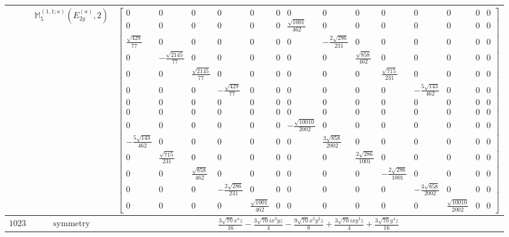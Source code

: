 \documentclass[fleqn,8pt,landscape]{jsarticle}
\begin{document}
\begin{longtable}{ccc}
$  $ & $ \mathbb{M}_{5}^{(1,1;a)}(E_{2g}^{(a)},2) $ & $ \begin{bmatrix} 0 & 0 & 0 & 0 & 0 & 0 & 0 & 0 & 0 & 0 & 0 & 0 & 0 & 0 \\ 0 & 0 & 0 & 0 & 0 & 0 & \frac{\sqrt{1001}}{462} & 0 & 0 & 0 & 0 & 0 & 0 & 0 \\ \frac{\sqrt{429}}{77} & 0 & 0 & 0 & 0 & 0 & 0 & - \frac{2 \sqrt{286}}{231} & 0 & 0 & 0 & 0 & 0 & 0 \\ 0 & - \frac{\sqrt{2145}}{77} & 0 & 0 & 0 & 0 & 0 & 0 & \frac{\sqrt{858}}{462} & 0 & 0 & 0 & 0 & 0 \\ 0 & 0 & \frac{\sqrt{2145}}{77} & 0 & 0 & 0 & 0 & 0 & 0 & \frac{\sqrt{715}}{231} & 0 & 0 & 0 & 0 \\ 0 & 0 & 0 & - \frac{\sqrt{429}}{77} & 0 & 0 & 0 & 0 & 0 & 0 & - \frac{5 \sqrt{143}}{462} & 0 & 0 & 0 \\ 0 & 0 & 0 & 0 & 0 & 0 & 0 & 0 & 0 & 0 & 0 & 0 & 0 & 0 \\ 0 & 0 & 0 & 0 & 0 & 0 & 0 & 0 & 0 & 0 & 0 & 0 & 0 & 0 \\ 0 & 0 & 0 & 0 & 0 & 0 & - \frac{\sqrt{10010}}{2002} & 0 & 0 & 0 & 0 & 0 & 0 & 0 \\ - \frac{5 \sqrt{143}}{462} & 0 & 0 & 0 & 0 & 0 & 0 & \frac{3 \sqrt{858}}{2002} & 0 & 0 & 0 & 0 & 0 & 0 \\ 0 & \frac{\sqrt{715}}{231} & 0 & 0 & 0 & 0 & 0 & 0 & \frac{2 \sqrt{286}}{1001} & 0 & 0 & 0 & 0 & 0 \\ 0 & 0 & \frac{\sqrt{858}}{462} & 0 & 0 & 0 & 0 & 0 & 0 & - \frac{2 \sqrt{286}}{1001} & 0 & 0 & 0 & 0 \\ 0 & 0 & 0 & - \frac{2 \sqrt{286}}{231} & 0 & 0 & 0 & 0 & 0 & 0 & - \frac{3 \sqrt{858}}{2002} & 0 & 0 & 0 \\ 0 & 0 & 0 & 0 & \frac{\sqrt{1001}}{462} & 0 & 0 & 0 & 0 & 0 & 0 & \frac{\sqrt{10010}}{2002} & 0 & 0 \end{bmatrix} $ \\ \hline
$ 1023 $ & $ \text{symmetry} $ & $ \frac{3 \sqrt{70} x^{4} z}{16} - \frac{3 \sqrt{70} i x^{3} y z}{4} - \frac{9 \sqrt{70} x^{2} y^{2} z}{8} + \frac{3 \sqrt{70} i x y^{3} z}{4} + \frac{3 \sqrt{70} y^{4} z}{16} $ \\

\end{longtable}
\end{document}
